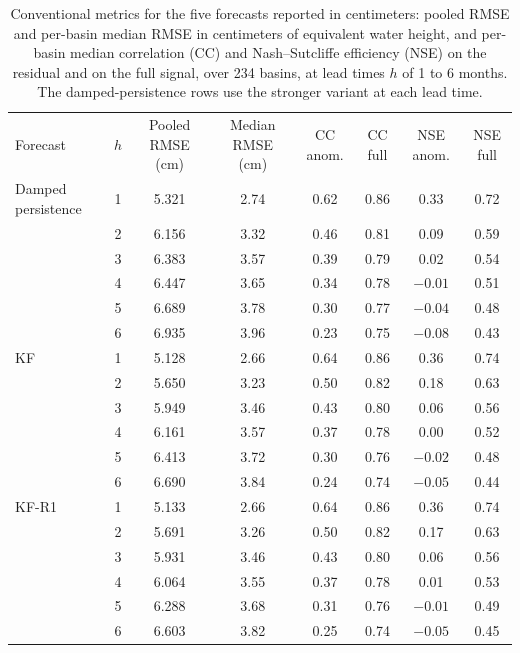 \documentclass[hess, manuscript]{copernicus}
\begin{document}
\begin{table}[!htbp]
\caption{Conventional metrics for the five forecasts reported in
centimeters: pooled RMSE and per-basin median RMSE in centimeters of
equivalent water height, and per-basin median correlation (CC) and
Nash--Sutcliffe efficiency (NSE) on the residual and on the full signal,
over 234 basins, at lead times $h$ of 1 to 6 months. The damped-persistence
rows use the stronger variant at each lead time.}
\label{tab:conventional}
\begin{tabular}{lccccccc}
\tophline
Forecast & $h$ & Pooled RMSE (cm) & Median RMSE (cm) & CC anom. & CC full & NSE anom. & NSE full \\
\middlehline
Damped persistence & 1 & 5.321 & 2.74 & 0.62 & 0.86 & 0.33 & 0.72 \\
 & 2 & 6.156 & 3.32 & 0.46 & 0.81 & 0.09 & 0.59 \\
 & 3 & 6.383 & 3.57 & 0.39 & 0.79 & 0.02 & 0.54 \\
 & 4 & 6.447 & 3.65 & 0.34 & 0.78 & $-0.01$ & 0.51 \\
 & 5 & 6.689 & 3.78 & 0.30 & 0.77 & $-0.04$ & 0.48 \\
 & 6 & 6.935 & 3.96 & 0.23 & 0.75 & $-0.08$ & 0.43 \\[4pt]
KF & 1 & 5.128 & 2.66 & 0.64 & 0.86 & 0.36 & 0.74 \\
 & 2 & 5.650 & 3.23 & 0.50 & 0.82 & 0.18 & 0.63 \\
 & 3 & 5.949 & 3.46 & 0.43 & 0.80 & 0.06 & 0.56 \\
 & 4 & 6.161 & 3.57 & 0.37 & 0.78 & 0.00 & 0.52 \\
 & 5 & 6.413 & 3.72 & 0.30 & 0.76 & $-0.02$ & 0.48 \\
 & 6 & 6.690 & 3.84 & 0.24 & 0.74 & $-0.05$ & 0.44 \\[4pt]
KF-R1 & 1 & 5.133 & 2.66 & 0.64 & 0.86 & 0.36 & 0.74 \\
 & 2 & 5.691 & 3.26 & 0.50 & 0.82 & 0.17 & 0.63 \\
 & 3 & 5.931 & 3.46 & 0.43 & 0.80 & 0.06 & 0.56 \\
 & 4 & 6.064 & 3.55 & 0.37 & 0.78 & 0.01 & 0.53 \\
 & 5 & 6.288 & 3.68 & 0.31 & 0.76 & $-0.01$ & 0.49 \\
 & 6 & 6.603 & 3.82 & 0.25 & 0.74 & $-0.05$ & 0.45 \\[4pt]

\end{tabular}
\end{table}
\end{document}
